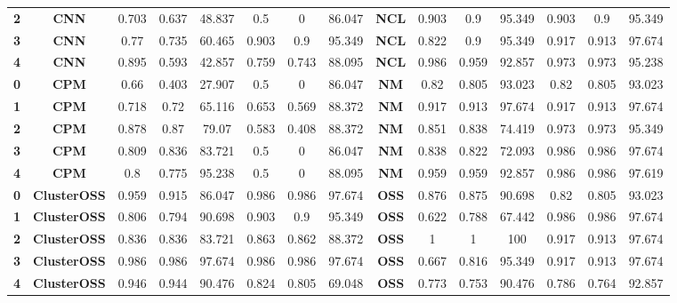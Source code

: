 {{\begin{tabular}{c|c|cccccc|ccccccc}
\textbf{2} & \textbf{CNN} & 0.703 & 0.637 & 48.837 & 0.5   & 0     & 86.047 & \multicolumn{1}{c|}{\textbf{NCL}} & 0.903 & 0.9   & 95.349 & 0.903 & 0.9   & 95.349 \\
\textbf{3} & \textbf{CNN} & 0.77  & 0.735 & 60.465 & 0.903 & 0.9   & 95.349 & \multicolumn{1}{c|}{\textbf{NCL}} & 0.822 & 0.9   & 95.349 & 0.917 & 0.913 & 97.674 \\
\textbf{4} & \textbf{CNN} & 0.895 & 0.593 & 42.857 & 0.759 & 0.743 & 88.095 & \multicolumn{1}{c|}{\textbf{NCL}} & 0.986 & 0.959 & 92.857 & 0.973 & 0.973 & 95.238 \\
\textbf{0} & \textbf{CPM} & 0.66  & 0.403 & 27.907 & 0.5   & 0     & 86.047 & \multicolumn{1}{c|}{\textbf{NM}} & 0.82  & 0.805 & 93.023 & 0.82  & 0.805 & 93.023 \\
\textbf{1} & \textbf{CPM} & 0.718 & 0.72  & 65.116 & 0.653 & 0.569 & 88.372 & \multicolumn{1}{c|}{\textbf{NM}} & 0.917 & 0.913 & 97.674 & 0.917 & 0.913 & 97.674 \\
\textbf{2} & \textbf{CPM} & 0.878 & 0.87  & 79.07 & 0.583 & 0.408 & 88.372 & \multicolumn{1}{c|}{\textbf{NM}} & 0.851 & 0.838 & 74.419 & 0.973 & 0.973 & 95.349 \\
\textbf{3} & \textbf{CPM} & 0.809 & 0.836 & 83.721 & 0.5   & 0     & 86.047 & \multicolumn{1}{c|}{\textbf{NM}} & 0.838 & 0.822 & 72.093 & 0.986 & 0.986 & 97.674 \\
\textbf{4} & \textbf{CPM} & 0.8   & 0.775 & 95.238 & 0.5   & 0     & 88.095 & \multicolumn{1}{c|}{\textbf{NM}} & 0.959 & 0.959 & 92.857 & 0.986 & 0.986 & 97.619 \\
\textbf{0} & \textbf{ClusterOSS} & 0.959 & 0.915 & 86.047 & 0.986 & 0.986 & 97.674 & \multicolumn{1}{c|}{\textbf{OSS}} & 0.876 & 0.875 & 90.698 & 0.82  & 0.805 & 93.023 \\
\textbf{1} & \textbf{ClusterOSS} & 0.806 & 0.794 & 90.698 & 0.903 & 0.9   & 95.349 & \multicolumn{1}{c|}{\textbf{OSS}} & 0.622 & 0.788 & 67.442 & 0.986 & 0.986 & 97.674 \\
\textbf{2} & \textbf{ClusterOSS} & 0.836 & 0.836 & 83.721 & 0.863 & 0.862 & 88.372 & \multicolumn{1}{c|}{\textbf{OSS}} & 1     & 1     & 100   & 0.917 & 0.913 & 97.674 \\
\textbf{3} & \textbf{ClusterOSS} & 0.986 & 0.986 & 97.674 & 0.986 & 0.986 & 97.674 & \multicolumn{1}{c|}{\textbf{OSS}} & 0.667 & 0.816 & 95.349 & 0.917 & 0.913 & 97.674 \\
\textbf{4} & \textbf{ClusterOSS} & 0.946 & 0.944 & 90.476 & 0.824 & 0.805 & 69.048 & \multicolumn{1}{c|}{\textbf{OSS}} & 0.773 & 0.753 & 90.476 & 0.786 & 0.764 & 92.857 \\

\end{tabular}}}
